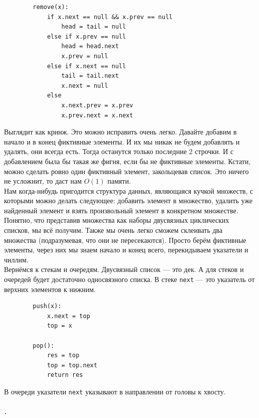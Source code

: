 \documentclass{article}
\newcommand{\pseudo}{PseudoLexer.py:PseudoLexer -x}
\newcommand{\pseudocode}[1]{\texttt{#1}}
\begin{document}
    \begin{verbatim}
        remove(x):
            if x.next == null && x.prev == null
                head = tail = null
            else if x.prev == null
                head = head.next
                x.prev = null
            else if x.next == null
                tail = tail.next
                x.next = null
            else
                x.next.prev = x.prev
                x.prev.next = x.next
    \end{verbatim}
    Выглядит как кринж. Это можно исправить очень легко. Давайте добавим в начало и в конец фиктивные элементы. И их мы никак не будем добавлять и удалять, они всегда есть. Тогда останутся только последние 2 строчки. И с добавлением была бы такая же фигня, если бы не фиктивные элементы. Кстати, можно сделать ровно один фиктивный элемент, закольцевав список. Это ничего не усложнит, то даст нам $O(1)$ памяти.\\
    Нам когда-нибудь пригодится структура данных, являющаяся кучкой множеств, с которыми можно делать следующее: добавить элемент в множество, удалить уже найденный элемент и взять произвольный элемент в конкретном множестве. Понятно, что представив множества как наборы двусвязных циклических списков, мы всё получим. Также мы очень легко сможем склеивать два множества (подразумевая, что они не пересекаются). Просто берём фиктивные элементы, через них мы знаем начало и конец всего, перекидываем указатели и чиллим.\\
    Вернёмся к стекам и очередям. Двусвязный список --- это дек. А для стеков и очередей будет достаточно односвязного списка. В стеке \pseudocode{next} --- это указатель от верхних элементов к нижним.
    \begin{verbatim}
        push(x):
            x.next = top
            top = x

        pop():
            res = top
            top = top.next
            return res
    \end{verbatim}
    В очереди указатели \pseudocode{next} указывают в направлении от головы к хвосту.
    \subparagraph{.}
\end{document}
